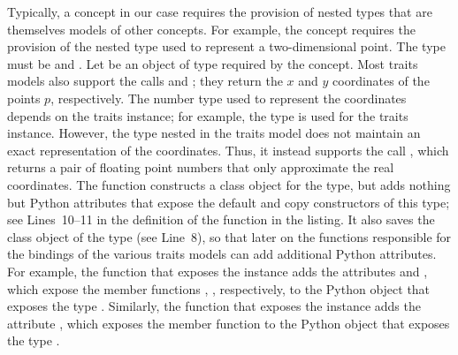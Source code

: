 Typically, a concept in our case requires the provision of nested
types that are themselves models of other concepts. For example, the
concept  requires the provision of the
nested type  used to represent a two-dimensional
point. The type  must be
 and
. Let  be an object of
type  required by the
 concept. Most traits models also
support the calls  and ; they
return the $x$ and $y$ coordinates of the points $p$,
respectively. The number type used to represent the coordinates
depends on the traits instance; for example, the type
 is used for the
 traits instance. However,
the  type nested in the traits model
 does not maintain an exact
representation of the coordinates. Thus, it instead supports the call
, which returns a pair of floating point
numbers that only approximate the real coordinates. The function
 constructs a class object
for the  type, but adds nothing but Python
attributes that expose the default and copy constructors of this type;
see Lines~10--11 in the definition of the function
 in the listing. It also
saves the class object of the  type (see
Line~8), so that later on the functions responsible for the bindings
of the various traits models can add additional Python attributes.
For example, the function that exposes the 
 instance adds the attributes
 and , which expose the member functions
, , respectively, to the Python 
object that exposes the type . Similarly, the 
function that exposes the  
instance adds the attribute , which exposes
the member function  to the Python 
object that exposes the type .

